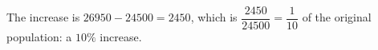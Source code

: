 The increase is $26950-24500=2450$, which is $\dfrac{2450}{24500}=\dfrac1{10}$ of the original population: a $\boxed{10\%}$ increase.
